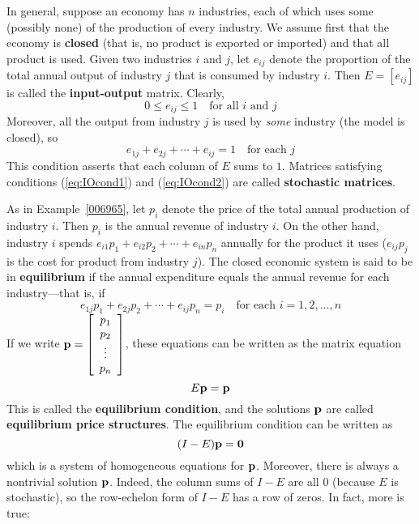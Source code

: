 \documentclass{ximera}
\begin{document}
In general, suppose an economy has $n$ industries, each of which uses some (possibly none) of the production of every industry. We assume first that the economy is \textbf{closed} (that is, no product is exported or imported) and that all product is used. Given two industries $i$ and $j$, let $e_{ij}$ denote the proportion of the total annual output of industry $j$ that is consumed by industry $i$. Then $E = \left[ e_{ij} \right]$ is called the \textbf{input-output} matrix.  Clearly,
\begin{equation}\label{eq:IOcond1}
0 \leq e_{ij} \leq 1 \quad \mbox{for all } i \mbox{ and } j
\end{equation}
Moreover, all the output from industry $j$ is used by \textit{some} industry (the model is closed), so
\begin{equation}\label{eq:IOcond2}
e_{1j} + e_{2j} + \cdots + e_{ij} = 1 \quad \mbox{for each } j
\end{equation}
This condition asserts that each column of $E$ sums to $1$. Matrices satisfying conditions (\ref{eq:IOcond1}) and (\ref{eq:IOcond2}) are called \textbf{stochastic matrices}.

As in Example~\ref{006965}, let $p_{i}$ denote the price of the total annual production of industry $i$. Then $p_{i}$ is the annual revenue of industry $i$. On the other hand, industry $i$ spends $e_{i1}p_{1} + e_{i2}p_{2} + \cdots + e_{in}p_{n}$ annually for the product it uses ($e_{ij}p_{j}$ is the cost for product from industry $j$). The closed economic system is said to be in \textbf{equilibrium} if the annual expenditure equals the annual revenue for each industry---that is, if
\begin{equation*}
e_{1j}p_{1} + e_{2j}p_{2} + \cdots + e_{ij}p_{n} = p_{i} \quad \mbox{for each } i = 1, 2, \dots, n
\end{equation*}
If we write ${\bf p} = \left[ \begin{array}{c}
p_{1} \\
p_{2} \\
\vdots \\
p_{n}
\end{array} \right]$,
 these equations can be written as the matrix equation
\begin{equation*}
E{\bf p} = {\bf p}
\end{equation*}
This is called the \textbf{equilibrium condition}, and the solutions ${\bf p}$ are called \textbf{equilibrium price structures}. The equilibrium condition can be written as
\begin{equation*}
(I - E){\bf p} = {\bf 0}
\end{equation*}
which is a system of homogeneous equations for ${\bf p}$. Moreover, there is always a nontrivial solution ${\bf p}$. Indeed, the column sums of $I - E$ are all $0$ (because $E$ is stochastic), so the row-echelon form of $I - E$ has a row of zeros. In fact, more is true:
\end{document}
